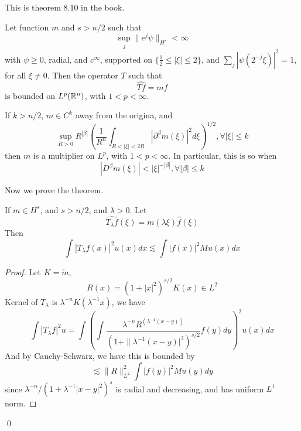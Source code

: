 This is theorem 8.10 in the book.
\begin{theorem}
    Let function $m$ and $s>n/2$ such that 
    \begin{equation*}
        \sup_j\|e^j\psi\|_{H^s}<\infty
    \end{equation*}
    with $\psi\geq 0$, radial, and $c^\infty$, supported on $\{\frac{1}{2}\leq|\xi|\leq 2\}$, and $\sum_j|\psi(2^{-j}\xi)|^2=1$, for all $\xi\neq 0$. Then the operator $T$ such that 
    \begin{equation*}
        \widehat{Tf}=m\hat{f}
    \end{equation*}
    is bounded on $L^p(\mathbb{R}^n)$, with $1<p<\infty$.
\end{theorem}
\begin{corollary}
    If $k>n/2$, $m\in C^k$ away from the origina, and 
    \begin{equation*}
        \sup_{R>0}R^{|\beta|}\left(\frac{1}{R^n}\int_{R<|\xi|<2R}|\partial^\beta m(\xi)|^2d\xi\right)^{1/2}, \forall |\xi|\leq k
    \end{equation*}
    then $m$ is a multiplier on $L^p$, with $1<p<\infty$. In particular, this is so when
    \begin{equation*}
        |D^\beta m(\xi)|<|\xi|^{-|\beta|}, \forall |\beta|\leq k
    \end{equation*}
\end{corollary}
Now we prove the theorem.
\begin{lemma}
    If $m\in H^s$, and $s>n/2$, and $\lambda>0$. Let 
    \begin{equation*}
        \widehat{T_\lambda f}(\xi)=m(\lambda\xi)\hat{f}(\xi)
    \end{equation*}
    Then 
    \begin{equation*}
        \int|T_\lambda f(x)|^2 u(x)dx\lesssim \int |f(x)|^2Mu(x)dx
    \end{equation*}
\end{lemma}
\begin{proof}
    Let $K=\check{m}$, 
    \begin{equation*}
        R(x)=(1+|x|^2)^{s/2}K(x)\in L^2
    \end{equation*}
    Kernel of $T_\lambda$ is $\lambda^{-n}K(\lambda^{-1}x)$, we have 
    \begin{equation*}
        \int |T_\lambda f|^2u=\int\left( \int \frac{\lambda^{-n}R^(\lambda^{-1}(x-y))}{(1+\|\lambda^{-1}(x-y)|^2)^{s/2}}f(y)dy\right)^2u(x)dx
    \end{equation*}
    And by Cauchy-Schwarz, we have 
    this is bounded by 
    \begin{equation*}
        \lesssim \|R\|_{L^2}^2\int |f(y)|^2Mu(y)dy
    \end{equation*}
    since $\lambda^{-n}/(1+\lambda^{-1}|x-y|^2)^s$ is radial and decreasing, and has uniform $L^1$ norm.
\end{proof}
\qed

